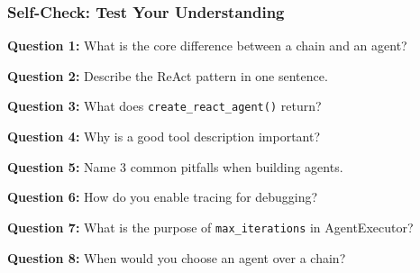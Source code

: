\documentclass[aspectratio=169,11pt]{beamer}
\begin{document}
\begin{frame}
\frametitle{Self-Check: Test Your Understanding}

\textbf{Question 1:} What is the core difference between a chain and an agent?

\vspace{0.3cm}

\textbf{Question 2:} Describe the ReAct pattern in one sentence.

\vspace{0.3cm}

\textbf{Question 3:} What does \texttt{create\_react\_agent()} return?

\vspace{0.3cm}

\textbf{Question 4:} Why is a good tool description important?

\vspace{0.3cm}

\textbf{Question 5:} Name 3 common pitfalls when building agents.

\vspace{0.3cm}

\textbf{Question 6:} How do you enable tracing for debugging?

\vspace{0.3cm}

\textbf{Question 7:} What is the purpose of \texttt{max\_iterations} in AgentExecutor?

\vspace{0.3cm}

\textbf{Question 8:} When would you choose an agent over a chain?

\end{frame}
\end{document}
